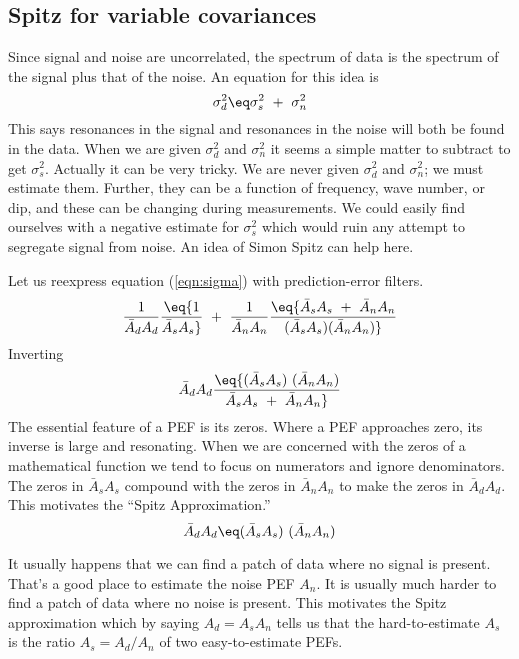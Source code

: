 \subsection{Spitz for variable covariances}
\par
Since signal and noise are uncorrelated,
the spectrum of data is the spectrum of the signal plus that of the noise.
An equation for this idea is
\begin{equation}
\label{eqn:sigma}
\sigma_d^2 \eq 
\sigma_s^2 \ + \ 
\sigma_n^2
\end{equation}
This says resonances in the signal
and resonances in the noise
will both be found in the data.
When we are given $\sigma_d^2$ and $\sigma_n^2$ it seems a simple
matter to subtract to get $\sigma_s^2$.
Actually it can be very tricky.
We are never given $\sigma_d^2$ and $\sigma_n^2$;
we must estimate them.
Further, they can be a function of frequency, wave number, or dip,
and these can be changing during measurements.
We could easily find ourselves with a negative estimate for
$\sigma_s^2$ which would ruin any attempt to segregate signal from noise.
An idea of Simon Spitz can help here.

\par
Let us reexpress equation (\ref{eqn:sigma}) with prediction-error filters.
\begin{equation}
{1\over \bar A_d A_d} \eq
{1\over \bar A_s A_s} \ + \ 
{1\over \bar A_n A_n}
\eq
{
	  {\bar A_s A_s} \ +\  {\bar A_n A_n}
	\over
	( {\bar A_s A_s} )   ( {\bar A_n A_n})
}
\end{equation}
Inverting
\begin{equation}
{ \bar A_d A_d} \eq
{
	( {\bar A_s A_s} ) \  ( {\bar A_n A_n})
	\over
	  {\bar A_s A_s} \ +\  {\bar A_n A_n}
}
\end{equation}
The essential feature of a PEF is its zeros.
Where a PEF approaches zero, its inverse is large and resonating.
When we are concerned with the zeros of a mathematical function
we tend to focus on numerators and ignore denominators.
The zeros in
${\bar A_s A_s}$
compound with the zeros in
${\bar A_n A_n}$
to make the zeros in 
${\bar A_d A_d}$.
This motivates the ``Spitz Approximation.''
\begin{equation}
{ \bar A_d A_d} \eq
	( {\bar A_s A_s} )\   ( {\bar A_n A_n})
\end{equation}

\par
It usually happens that we can
find a patch of data where no signal is present.
That's a good place to estimate the noise PEF $A_n$.
It is usually much harder to find a patch of data where no noise is present.
This motivates the Spitz approximation which by saying
$ A_d = A_s  A_n $
tells us that the hard-to-estimate $A_s$ is the ratio
$ A_s = A_d /  A_n $
of two easy-to-estimate PEFs.

